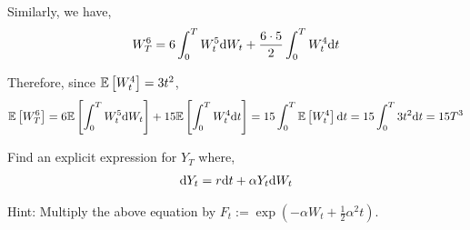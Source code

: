 \documentclass[10pt]{article}
\begin{document}
\begin{solution}[Solution]
Similarly, we have,
\begin{align*}
    W_T^6 = 6\int_{0}^{T} W_t^5 \mathrm{d} W_t + \dfrac{6\cdot 5}{2}\int_{0}^{T} W_t^4 \mathrm{d} t 
\end{align*}

Therefore, since \( \mathbb{E} \left[ W_t^4 \right] = 3t^2 \),
\begin{align*}
    \mathbb{E}\left[W_T^6\right] = 6 \mathbb{E}\left[\int_{0}^{T} W_t^5 \mathrm{d} W_t\right] + 15 \mathbb{E}\left[\int_{0}^{T} W_t^4 \mathrm{d} t \right] = 15 \int_{0}^{T} \mathbb{E} \left[ W_t^4 \right] \mathrm{d} t = 15 \int_{0}^{T} 3t^2 \mathrm{d} t = 15T^3 
\end{align*}
\end{solution}

\begin{problem}[Exercise 8.2]
Find an explicit expression for \( Y_T \) where,
\begin{align*}
    \mathrm{d} Y_t = r \mathrm{d} t + \alpha Y_t \mathrm{d} W_t
\end{align*}

    Hint: Multiply the above equation by \( F_t := \exp(- \alpha W_t + \frac{1}{2} \alpha^2t) \).

\end{problem}
\end{document}
